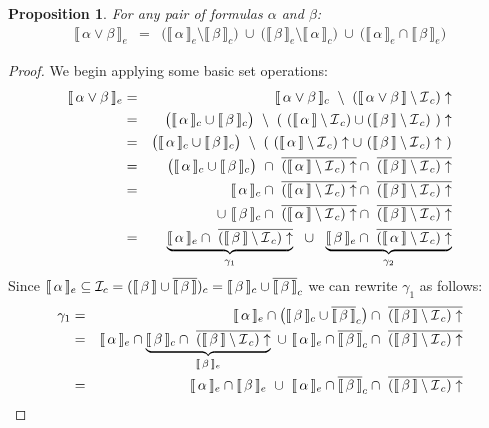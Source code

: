 \documentclass{tlp}
\def\cI{{\cal I}}
\def\cIc{{\cal I}_{\, c}}
\def\up{\uparrow}
\newcommand\non[1]{\overline{#1} }
\newcommand{\den}[1]{\llbracket \, #1 \, \rrbracket}
\newtheorem{proposition}{Proposition}
\begin{document}
\begin{proposition}\label{prop:or}
For any pair of formulas $\alpha$ and $\beta$:
\begin{eqnarray*}
\den{\alpha \vee \beta}_e & = & 
\big( \den{\alpha}_e \setminus \den{\beta}_c \big)
\ \cup \
\big( \den{\beta}_e \setminus \den{\alpha}_c \big)
\ \cup \
\big( \den{\alpha}_e \cap \den{\beta}_e \big)
\end{eqnarray*}
\end{proposition}
\begin{proof}
We begin applying some basic set operations:
\begin{eqnarray*}
\den{\alpha \vee \beta}_e & = & \den{\alpha \vee \beta}_c \ \setminus \ (\den{\alpha \vee \beta} \setminus \cIc ) \up  \\
& = &\big( \den{\alpha}_c \cup \den{\beta}_c \big)\ \setminus \ (\ (\den{\alpha}\setminus \cIc) \cup (\den{\beta} \setminus \cIc) \ ) \up  \\
& = &\big( \den{\alpha}_c \cup \den{\beta}_c \big)\ \setminus \ ( \ (\den{\alpha}\setminus \cIc)\up \cup \ (\den{\beta} \setminus \cIc)\up \ )  \\
& = &\big( \den{\alpha}_c \cup \den{\beta}_c \big)\ \cap \ \non{(\den{\alpha}\setminus \cIc)\up} \cap \ \non{(\den{\beta} \setminus \cIc)\up}  \\
& = &\den{\alpha}_c  \cap \ \non{(\den{\alpha}\setminus \cIc)\up} \cap \ \non{(\den{\beta} \setminus \cIc)\up}  \\
& & \cup \ \den{\beta}_c \cap \ \non{(\den{\alpha}\setminus \cIc)\up} \cap \ \non{(\den{\beta} \setminus \cIc)\up}  \\
& = &\underbrace{\den{\alpha}_e  \cap \ \non{(\den{\beta} \setminus \cIc)\up}}_{\gamma_1}  \ \ \cup \ \ \underbrace{\den{\beta}_e \cap \ \non{(\den{\alpha}\setminus \cIc)\up}}_{\gamma_2}
\end{eqnarray*}
Since $\den{\alpha}_e \subseteq \cI_c = (\den{\beta}\cup \non{\den{\beta}})_c = \den{\beta}_c \cup \non{\den\beta}_c$ we can rewrite $\gamma_1$ as follows:
\begin{eqnarray*}
\gamma_1 & = & \den{\alpha}_e \cap \big( \den{\beta}_c \cup \non{\den\beta}_c  \big) \cap \ \non{(\den{\beta} \setminus \cIc)\up} \nonumber \\
& = & \den{\alpha}_e \cap \underbrace{\den{\beta}_c \cap \ \non{(\den{\beta} \setminus \cIc)\up}}_{\den{\beta}_e} \ \cup \ \den{\alpha}_e \cap \non{\den{\beta}}_c \cap \ \non{(\den{\beta} \setminus \cIc)\up} \nonumber \\
& = & \den{\alpha}_e \cap \den{\beta}_e \ \cup \ \den{\alpha}_e \cap \non{\den{\beta}}_c \cap \ \non{(\den{\beta} \setminus \cIc)\up}

\end{eqnarray*}
\end{proof}
\end{document}
